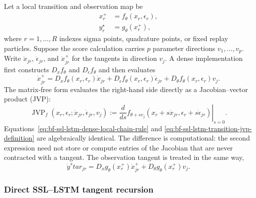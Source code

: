 Let a local transition and observation map be
\begin{align}
  x^+_r &= f_\theta(x_r,\epsilon_r), \\
  y_r^\star &= g_\theta(x^+_r),
  \label{eq:bf-ssl-lstm-local-point-maps}
\end{align}
where $r=1,\ldots,R$ indexes sigma points, quadrature points, or fixed replay
particles.  Suppose the score calculation carries $p$ parameter directions
$v_1,\ldots,v_p$.  Write $\dot x_{jr}$, $\dot\epsilon_{jr}$, and
$\dot x^+_{jr}$ for the tangents in direction $v_j$.  A dense implementation
first constructs $D_xf_\theta$ and $D_\epsilon f_\theta$ and then evaluates
\begin{equation}
  \dot x^+_{jr}
  =D_xf_\theta(x_r,\epsilon_r)\dot x_{jr}
   +D_\epsilon f_\theta(x_r,\epsilon_r)\dot\epsilon_{jr}
   +D_\theta f_\theta(x_r,\epsilon_r)v_j.
  \label{eq:bf-ssl-lstm-dense-local-chain-rule}
\end{equation}
The matrix-free form evaluates the right-hand side directly as a
Jacobian--vector product (JVP):
\begin{equation}
  \operatorname{JVP}_{f}
  (x_r,\epsilon_r;\dot x_{jr},\dot\epsilon_{jr},v_j)
  :=\left.\frac{d}{ds}
  f_{\theta+s v_j}
  (x_r+s\dot x_{jr},\epsilon_r+s\dot\epsilon_{jr})
  \right|_{s=0}.
  \label{eq:bf-ssl-lstm-transition-jvp-definition}
\end{equation}
Equations~\eqref{eq:bf-ssl-lstm-dense-local-chain-rule} and
\eqref{eq:bf-ssl-lstm-transition-jvp-definition} are algebraically identical.
The difference is computational: the second expression need not store or
compute entries of the Jacobian that are never contracted with a tangent.
The observation tangent is treated in the same way,
\begin{equation}
  \dot y^star_{jr}
  =D_xg_\theta(x^+_r)\dot x^+_{jr}
   +D_\theta g_\theta(x^+_r)v_j.
  \label{eq:bf-ssl-lstm-observation-jvp-definition}
\end{equation}

\subsubsection{Direct SSL--LSTM tangent recursion}

